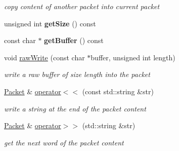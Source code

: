 \begin{DoxyCompactItemize}
\begin{DoxyCompactList}\small\item\em copy content of another packet into current packet \end{DoxyCompactList}\item 
\hypertarget{classFTP_1_1Packet_ab67e5329d916ca745500c5cc0942a3f1}{}unsigned int {\bfseries get\+Size} () const \label{classFTP_1_1Packet_ab67e5329d916ca745500c5cc0942a3f1}

\item 
\hypertarget{classFTP_1_1Packet_af141e6f529ed3230e562ee3f3340fbcb}{}const char $\ast$ {\bfseries get\+Buffer} () const \label{classFTP_1_1Packet_af141e6f529ed3230e562ee3f3340fbcb}

\item 
\hypertarget{classFTP_1_1Packet_a579ab0ada8b4adbd2685cd6a8389c05a}{}void \hyperlink{classFTP_1_1Packet_a579ab0ada8b4adbd2685cd6a8389c05a}{raw\+Write} (const char $\ast$buffer, unsigned int length)\label{classFTP_1_1Packet_a579ab0ada8b4adbd2685cd6a8389c05a}

\begin{DoxyCompactList}\small\item\em write a raw buffer of size \textquotesingle{}length\textquotesingle{} into the packet \end{DoxyCompactList}\item 
\hypertarget{classFTP_1_1Packet_af3ce1782e8b128d3c5e29cb42ca00f97}{}\hyperlink{classFTP_1_1Packet}{Packet} \& \hyperlink{classFTP_1_1Packet_af3ce1782e8b128d3c5e29cb42ca00f97}{operator$<$$<$} (const std\+::string \&str)\label{classFTP_1_1Packet_af3ce1782e8b128d3c5e29cb42ca00f97}

\begin{DoxyCompactList}\small\item\em write a string at the end of the packet content \end{DoxyCompactList}\item 
\hypertarget{classFTP_1_1Packet_ad8407d95fda0ff5febf2ceb8fdbf67fe}{}\hyperlink{classFTP_1_1Packet}{Packet} \& \hyperlink{classFTP_1_1Packet_ad8407d95fda0ff5febf2ceb8fdbf67fe}{operator$>$$>$} (std\+::string \&str)\label{classFTP_1_1Packet_ad8407d95fda0ff5febf2ceb8fdbf67fe}

\begin{DoxyCompactList}\small\item\em get the next word of the packet content \end{DoxyCompactList}\end{DoxyCompactItemize}

